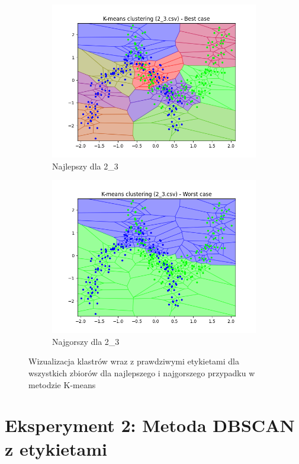 \documentclass[12pt]{article}
\begin{document}
\begin{figure}[H]
\begin{subfigure}[b]{0.24\textwidth}
        \includegraphics[width=\linewidth]{img/exp_2/kmeans/2_3_best.png}
        \caption{Najlepszy dla 2\_3}
    \end{subfigure}
    \hfill
    \begin{subfigure}[b]{0.24\textwidth}
        \includegraphics[width=\linewidth]{img/exp_2/kmeans/2_3_worst.png}
        \caption{Najgorszy dla 2\_3}
    \end{subfigure}
    \caption{\centering Wizualizacja klastrów wraz z prawdziwymi etykietami dla wszystkich zbiorów dla najlepszego i najgorszego przypadku w metodzie K-means}
\end{figure}

\newpage
\section{Eksperyment 2: Metoda DBSCAN z etykietami}
\end{document}

